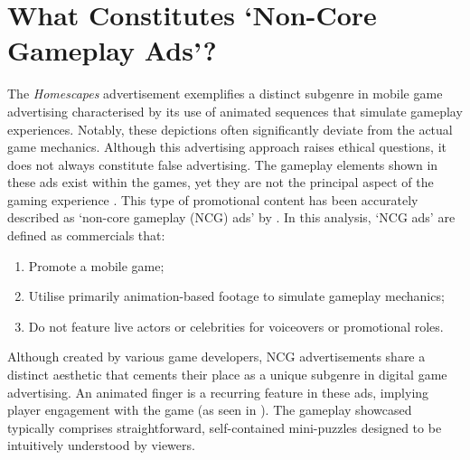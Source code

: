 \documentclass[a4paper, 12pt, mla]{homework}
\begin{document}
\section*{What Constitutes `Non-Core Gameplay Ads'?}
The \textit{Homescapes} advertisement exemplifies a distinct subgenre in mobile game advertising characterised by its use of animated sequences that simulate gameplay experiences. 
Notably, these depictions often significantly deviate from the actual game mechanics. 
Although this advertising approach raises ethical questions, it does not always constitute false advertising. 
The gameplay elements shown in these ads exist within the games, yet they are not the principal aspect of the gaming experience \cite{WB:Semenov2023}. 
This type of promotional content has been accurately described as `non-core gameplay (NCG) ads' by .
In this analysis, `NCG ads' are defined as commercials that: 
\begin{enumerate} 
	\item Promote a mobile game; 
	\item Utilise primarily animation-based footage to simulate gameplay mechanics; 
	\item Do not feature live actors or celebrities for voiceovers or promotional roles.
\end{enumerate}

Although created by various game developers, NCG advertisements share a distinct aesthetic that cements their place as a unique subgenre in digital game advertising. 
An animated finger is a recurring feature in these ads, implying player engagement with the game (as seen in ). 
The gameplay showcased typically comprises straightforward, self-contained mini-puzzles designed to be intuitively understood by viewers.
\end{document}
